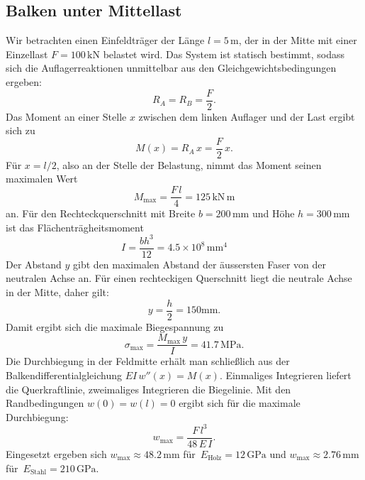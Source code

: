 \subsection{Balken unter Mittellast}
Wir betrachten einen Einfeldträger der Länge \(l = 5\,\mathrm{m}\), der in der Mitte mit einer Einzellast \(F = 100\,\mathrm{kN}\) belastet wird. 
Das System ist statisch bestimmt, sodass sich die Auflagerreaktionen unmittelbar aus den Gleichgewichtsbedingungen ergeben:
\[
  R_A = R_B = \frac{F}{2}.
\]
Das Moment an einer Stelle \(x\) zwischen dem linken Auflager und der Last ergibt sich zu
\[
  M(x) = R_A \, x = \frac{F}{2}\,x.
\]
Für \(x=l/2\), also an der Stelle der Belastung, nimmt das Moment seinen 
maximalen Wert
\begin{equation}
  M_{\max} = \frac{F\,l}{4} = 125\,\mathrm{kN\,m}
  \label{eq:Mmax}
\end{equation}
an. Für den Rechteckquerschnitt mit Breite \(b=200\,\mathrm{mm}\) 
und Höhe \(h=300\,\mathrm{mm}\) ist das Flächenträgheitsmoment
\[
  I = \frac{b h^3}{12} = 4.5 \times 10^8\,\mathrm{mm^4}
  \qquad 
\]
Der Abstand \(y\) gibt den maximalen Abstand der äussersten Faser von der neutralen Achse an. 
Für einen rechteckigen Querschnitt liegt die neutrale Achse 
in der Mitte, daher gilt:
\[
  y = \frac{h}{2}= 150\mathrm{mm}.
\]
Damit ergibt sich die maximale Biegespannung zu
\begin{equation}
  \sigma_{\max} = \frac{M_{\max}\,y}{I} = 41.7\,\mathrm{MPa}.
  \label{eq:sigma_max}
\end{equation}
Die Durchbiegung in der Feldmitte erhält man schließlich aus der Balkendifferentialgleichung \(EI\,w''(x)=M(x)\). 
Einmaliges Integrieren liefert die Querkraftlinie, zweimaliges Integrieren die Biegelinie. 
Mit den Randbedingungen \(w(0)=w(l)=0\) ergibt sich für die 
maximale Durchbiegung:
\begin{equation}
  w_{\max} = \frac{F\,l^3}{48\,E\,I}.
  \label{eq:wmax}
\end{equation}
Eingesetzt ergeben sich 
\(w_{\max} \approx 48.2\,\mathrm{mm}\) für 
\(\,E_{\text{Holz}}=12\,\mathrm{GPa}\)
und
\(w_{\max} \approx 2.76\,\mathrm{mm}\) für 
\(\,E_{\text{Stahl}}=210\,\mathrm{GPa}\).
